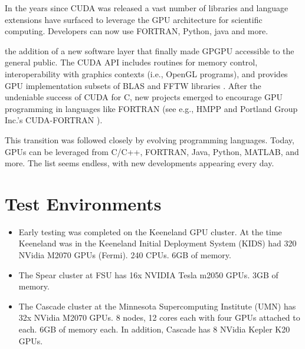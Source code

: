 \documentclass{report}
\begin{document}
In the years since CUDA was released a vast number of libraries and language extensions have surfaced to leverage the GPU architecture for scientific computing. Developers can now use FORTRAN, Python, java and more. 




the addition of a new software layer that finally made GPGPU accessible to the general public. The CUDA API includes routines for memory control, interoperability with graphics contexts (i.e., 
OpenGL programs), and provides GPU implementation subsets of BLAS and FFTW libraries \cite{CudaGuide2013}. After the undeniable success of CUDA for C, new projects emerged to encourage GPU programming in languages like FORTRAN (see e.g., HMPP \cite{HMPP2009} and Portland Group Inc.'s CUDA-FORTRAN \cite{CudaFortran2009}). 

This transition was 
followed closely by evolving programming languages. Today, GPUs can be leveraged from C/C++, FORTRAN, Java, Python, MATLAB, and more. The list seems endless, with new developments appearing every day. 



\section{Test Environments}

\begin{itemize}	
\item Early testing was completed on the Keeneland GPU cluster. At the time Keeneland was in the Keeneland Initial Deployment System (KIDS) had 320 NVidia M2070 GPUs (Fermi). 240 CPUs. 6GB of memory. 
\item The Spear cluster at FSU has 16x NVIDIA Tesla m2050 GPUs. 3GB of memory. 
\item The Cascade cluster at the Minnesota Supercomputing Institute (UMN) has 32x NVidia M2070 GPUs. 8 nodes, 12 cores each with four GPUs attached to each. 6GB of memory each. In addition, Cascade has 8 NVidia Kepler K20 GPUs. 
\end{itemize}
\end{document}
